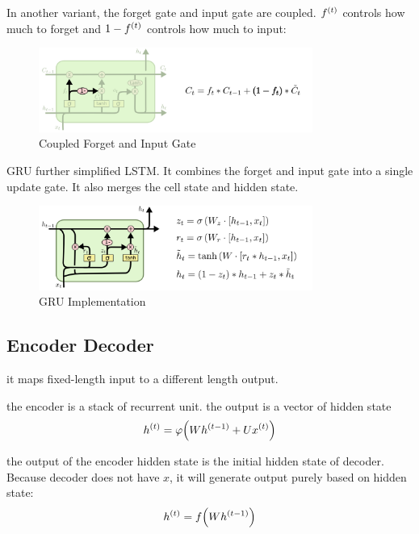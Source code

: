 \begin{definition}
    In another variant, the forget gate and input gate are coupled. ${f}^{(t)}$ controls how much to forget and $1- {f}^{(t)}$ controls how much to input:
    \begin{figure}[H]
\includegraphics[width=0.8\textwidth]{machine_learning/pic/04/LSTM3-var-tied.png}
\centering
\caption{Coupled Forget and Input Gate}
\end{figure}
\end{definition}


\begin{definition}[GRU]
    GRU further simplified LSTM. It combines the forget and input gate into a single update gate. It also merges the cell state and hidden state.
\begin{figure}[H]
\includegraphics[width=0.8\textwidth]{machine_learning/pic/04/LSTM3-var-GRU.png}
\centering
\caption{GRU Implementation}
\end{figure}
\end{definition}



\subsection{Encoder Decoder}

it maps fixed-length input to a different length output.

the encoder is a stack of recurrent unit. the output is a vector of hidden state
\begin{equation}
    \selectonesample{h}{t} = \varphi \mleft(W \selectonesample{h}{t-1} + U \selectonesample{x}{t} \mright)
\end{equation}

the output of the encoder hidden state is the initial hidden state of decoder. Because decoder does not have $x$, it will generate output purely based on hidden state:
\begin{equation}
    \selectonesample{h}{t} = f \mleft(W \selectonesample{h}{t-1} \mright)
\end{equation}

